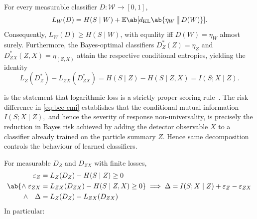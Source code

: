 \documentclass[12pt]{article}
\newcommand{\E}{\mathbb{E}}
\newcommand{\kl}{d_{\mathrm{KL}}}
\newcommand{\1}{\mathbbm{1}}
\renewcommand{\[}{\begin{equation}}
\renewcommand{\]}{\end{equation}}
\begin{document}
\begin{proposition}
    \label{prop:bayes}
        For every measurable classifier \(D : \mathcal{W} \to [0, 1]\),
        \[
        \label{eq:logloss-decomp}
            L_W(D)=H(S\mid W)+\E\ab[\kl\ab\{\eta_W\,\big\|\,D(W)\}].
        \]
        Consequently, \(L_W(D)\ge H(S\mid W)\), with equality iff \( D(W) = \eta_W \) almost surely.
        Furthermore, the Bayes-optimal classifiers \(D_Z^*(Z) = \eta_Z\) and \(D_{ZX}^*(Z, X) = \eta_{(Z, X)}\) attain the respective conditional entropies, yielding the identity
        \[
        \label{eq:bce-cmi}
            L_Z( D_Z^* ) - L_{ZX} (D_{ZX}^*) = H(S \mid Z) - H(S \mid Z, X) = I( S; X \mid Z).
        \]
    \end{proposition}

     is the statement that logarithmic loss is a strictly proper scoring rule~\cite{Gneiting:2007}.
    The risk difference in \cref{eq:bce-cmi} establishes that the conditional mutual information \(I(S; X \mid Z),\) and hence the severity of response non-universality, is precisely the reduction in Bayes risk achieved by adding the detector observable \(X\) to a classifier already trained on the particle summary \(Z\).
    Hence same decomposition controls the behaviour of learned classifiers.

    \begin{corollary}
    \label{cor:finite}
        For measurable \(D_Z\) and \(D_{ZX}\) with finite losses,
        \begin{equation}
        \label{eq:gain-decomp}
        \ab\{
        \begin{aligned}
            \varepsilon_Z &= L_Z(D_Z) - H(S \mid Z) \ge 0 \\
            \land\;\varepsilon_{ZX} &= L_{ZX}(D_{ZX}) - H(S \mid Z, X) \ge 0 \\
            \land\quad\Delta &= L_Z(D_Z) - L_{ZX}(D_{ZX})
        \end{aligned}
        \}
        \implies
        \Delta = I(S; X \mid Z) + \varepsilon_Z - \varepsilon_{ZX}
        \end{equation}
        In particular:
    \end{corollary}
\end{document}
